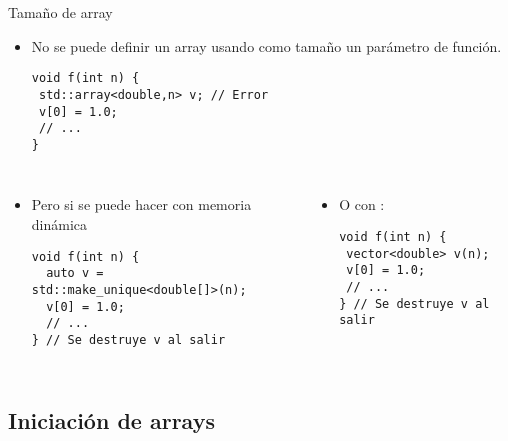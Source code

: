 \begin{frame}[t,fragile]{Tamaño de array}
\begin{itemize}
  \item No se puede definir un array usando como tamaño un parámetro de función.
\begin{lstlisting}
void f(int n) {
 std::array<double,n> v; // Error
 v[0] = 1.0;
 // ...
}
\end{lstlisting}
\end{itemize}

\begin{columns}[T]

\begin{itemize}
  \item Pero si se puede hacer con memoria dinámica
\begin{lstlisting}
void f(int n) {
  auto v = std::make_unique<double[]>(n);
  v[0] = 1.0;
  // ...
} // Se destruye v al salir
\end{lstlisting}
\end{itemize}

\begin{itemize}
  \item O con :
\begin{lstlisting}
void f(int n) {
 vector<double> v(n);
 v[0] = 1.0;
 // ...
} // Se destruye v al salir
\end{lstlisting}
\end{itemize}
\end{columns}

\end{frame}

\subsection{Iniciación de arrays}

